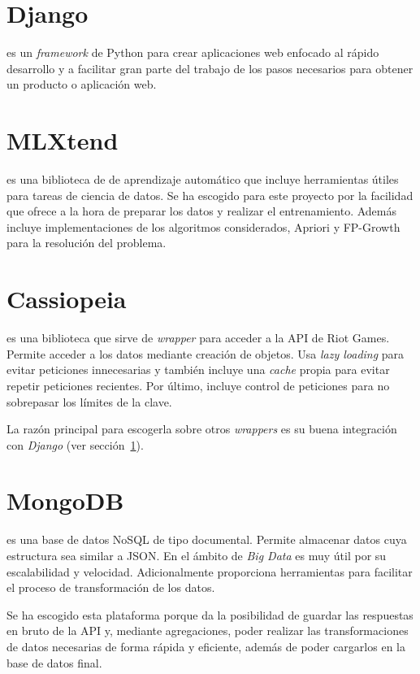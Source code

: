\section{Django}\label{django}
 es un \textit{framework} de Python para crear aplicaciones web enfocado al rápido desarrollo y a facilitar gran parte del trabajo de los pasos necesarios para obtener un producto o aplicación web.

\section{MLXtend}
 es una biblioteca de de aprendizaje automático que incluye herramientas útiles para tareas de ciencia de datos. Se ha escogido para este proyecto por la facilidad que ofrece a la hora de preparar los datos y realizar el entrenamiento. Además incluye implementaciones de los algoritmos considerados, Apriori y FP-Growth para la resolución del problema.

\section{Cassiopeia}
 es una biblioteca que sirve de \textit{wrapper} para acceder a la API de Riot Games. Permite acceder a los datos mediante creación de objetos. Usa \textit{lazy loading} para evitar peticiones innecesarias y también incluye una \textit{cache} propia para evitar repetir peticiones recientes. Por último, incluye control de peticiones para no sobrepasar los límites de la clave.

La razón principal para escogerla sobre otros \textit{wrappers} es su buena integración con \textit{Django} (ver sección~\ref{django}).

\section{MongoDB}
 es una base de datos NoSQL de tipo documental. Permite almacenar datos cuya estructura sea similar a JSON. En el ámbito de \textit{Big Data} es muy útil por su escalabilidad y velocidad. Adicionalmente proporciona herramientas para facilitar el proceso de transformación de los datos.

Se ha escogido esta plataforma porque da la posibilidad de guardar las respuestas en bruto de la API y, mediante agregaciones, poder realizar las transformaciones de datos necesarias de forma rápida y eficiente, además de poder cargarlos en la base de datos final.